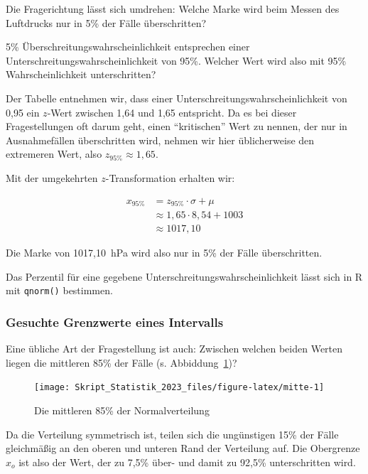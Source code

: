 \documentclass[
  11pt,
  ngerman,
  a4paper,
]{report}
\newenvironment{rtip}{
  \medskip
  \begin{tcolorbox}[colframe=purple,colback=light_gray,title=Softwarehinweis]
}{
  \end{tcolorbox}
  \medskip
}
\begin{document}
Die Fragerichtung lässt sich umdrehen: Welche Marke wird beim Messen des Luftdrucks nur in 5\% der Fälle überschritten?

5\% Überschreitungswahrscheinlichkeit entsprechen einer Unterschreitungswahrscheinlichkeit von 95\%. Welcher Wert wird also mit 95\% Wahrscheinlichkeit unterschritten?

Der Tabelle entnehmen wir, dass einer Unterschreitungswahrscheinlichkeit von 0,95 ein \(z\)-Wert zwischen 1,64 und 1,65 entspricht. Da es bei dieser Fragestellungen oft darum geht, einen \enquote{kritischen} Wert zu nennen, der nur in Ausnahmefällen überschritten wird, nehmen wir hier üblicherweise den extremeren Wert, also \(z_{95\%}\approx 1,65\).

Mit der umgekehrten \(z\)-Transformation erhalten wir:

\[
  \begin{aligned}
    x_{95\%}&=z_{95\%}\cdot \sigma + \mu \\
       &\approx 1{,}65\cdot 8{,}54 + 1003\\
       &\approx 1017{,}10
  \end{aligned}
\]

Die Marke von 1017,10~hPa wird also nur in 5\% der Fälle überschritten.

\begin{rtip}
Das Perzentil für eine gegebene Unterschreitungswahrscheinlichkeit lässt sich in R mit \verb|qnorm()| bestimmen.
\end{rtip}

\hypertarget{gesuchte-grenzwerte-eines-intervalls}{%
\subsubsection{Gesuchte Grenzwerte eines Intervalls}\label{gesuchte-grenzwerte-eines-intervalls}}

Eine übliche Art der Fragestellung ist auch: Zwischen welchen beiden Werten liegen die mittleren 85\% der Fälle (s. Abbiddung~\ref{fig:mitte})?

\begin{figure}[!h]

{\centering \texttt{[image: Skript\_Statistik\_2023\_files/figure-latex/mitte-1]} 

}

\caption{Die mittleren 85\% der Normalverteilung}\label{fig:mitte}
\end{figure}

Da die Verteilung symmetrisch ist, teilen sich die ungünstigen 15\% der Fälle gleichmäßig an den oberen und unteren Rand der Verteilung auf. Die Obergrenze \(x_o\) ist also der Wert, der zu 7,5\% über- und damit zu 92,5\% unterschritten wird.
\end{document}
